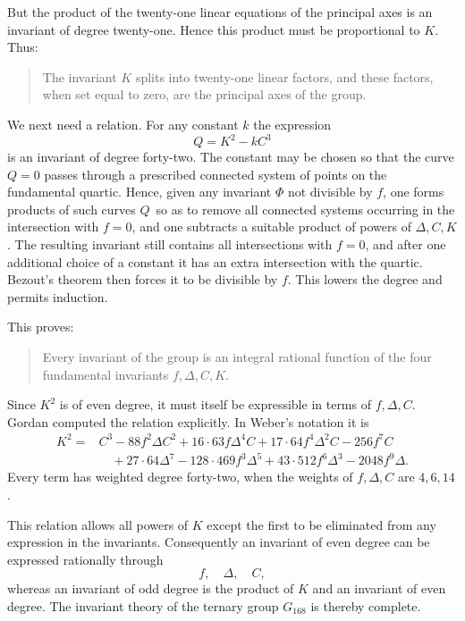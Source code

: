 \documentclass[11pt,a4paper]{book}
\begin{document}
But the product of the twenty-one linear equations of the principal axes is an invariant of degree twenty-one.  Hence this product must be proportional to \(K\).  Thus:
\begin{quote}
The invariant \(K\) splits into twenty-one linear factors, and these factors, when set equal to zero, are the principal axes of the group.
\end{quote}

We next need a relation.  For any constant \(k\) the expression
\[
 Q=K^2-kC^3
\]
is an invariant of degree forty-two.  The constant may be chosen so that the curve \(Q=0\) passes through a prescribed connected system of points on the fundamental quartic.  Hence, given any invariant \(\Phi\) not divisible by \(f\), one forms products of such curves \(Q\,\) so as to remove all connected systems occurring in the intersection with \(f=0\), and one subtracts a suitable product of powers of \(\Delta,C,K\).  The resulting invariant still contains all intersections with \(f=0\), and after one additional choice of a constant it has an extra intersection with the quartic.  Bezout's theorem then forces it to be divisible by \(f\).  This lowers the degree and permits induction.

This proves:
\begin{quote}
Every invariant of the group is an integral rational function of the four fundamental invariants \(f,\Delta,C,K\).
\end{quote}

Since \(K^2\) is of even degree, it must itself be expressible in terms of \(f,\Delta,C\).  Gordan computed the relation explicitly.  In Weber's notation it is
\[
\begin{aligned}
K^2={}&C^3-88 f^2\Delta C^2
   +16\cdot63 f\Delta^4 C
   +17\cdot64 f^4\Delta^2 C
   -256 f^7 C \\
&\quad +27\cdot64\Delta^7
   -128\cdot469 f^3\Delta^5
   +43\cdot512 f^6\Delta^3
   -2048 f^9\Delta .
\end{aligned}
\]
Every term has weighted degree forty-two, when the weights of \(f,\Delta,C\) are \(4,6,14\).

This relation allows all powers of \(K\) except the first to be eliminated from any expression in the invariants.  Consequently an invariant of even degree can be expressed rationally through
\[
 f,
\quad \Delta,
\quad C,
\]
whereas an invariant of odd degree is the product of \(K\) and an invariant of even degree.  The invariant theory of the ternary group \(G_{168}\) is thereby complete.
\end{document}
